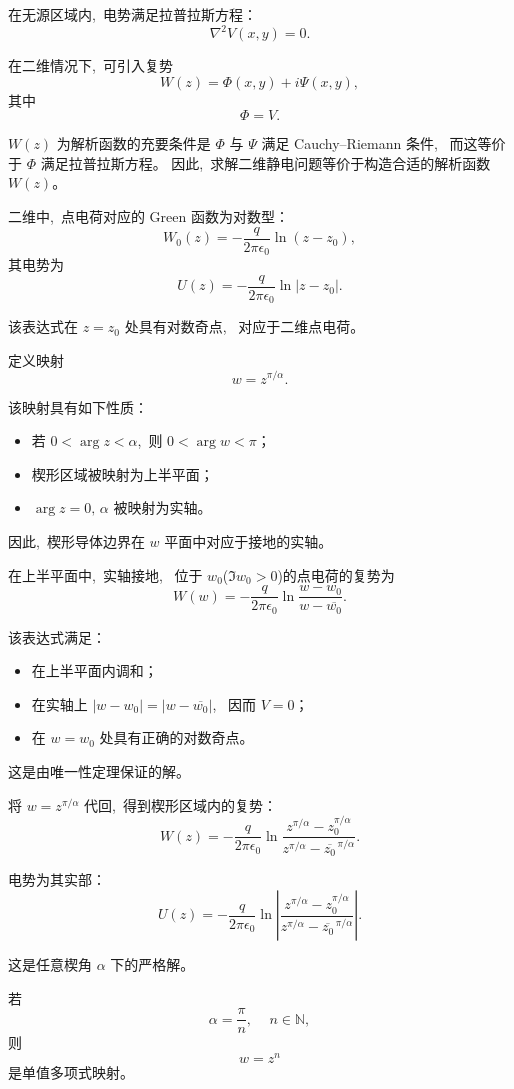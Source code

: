 在无源区域内, \,电势满足拉普拉斯方程：
\[
\nabla^2 V(x,y) = 0.
\]

在二维情况下, \,可引入复势
\[
W(z) = \Phi(x,y) + i \Psi(x,y),
\]
其中
\[
\Phi = V.
\]

$W(z)$ 为解析函数的充要条件是
$\Phi$ 与 $\Psi$ 满足 Cauchy--Riemann 条件, \,
而这等价于 $\Phi$ 满足拉普拉斯方程。
因此, \,求解二维静电问题等价于构造合适的解析函数 $W(z)$。


二维中, \,点电荷对应的 Green 函数为对数型：
\[
W_0(z) =
-\frac{q}{2\pi\epsilon_0} \ln (z - z_0),
\]
其电势为
\[
U(z) = -\frac{q}{2\pi\epsilon_0} \ln |z - z_0|.
\]

该表达式在 $z=z_0$ 处具有对数奇点, \,
对应于二维点电荷。


定义映射
\[
w = z^{\pi/\alpha}.
\]

该映射具有如下性质：
\begin{itemize}
  \item 若 $0 < \arg z < \alpha$, \,则 $0 < \arg w < \pi$；
  \item 楔形区域被映射为上半平面；
  \item $\arg z = 0, \,\alpha$ 被映射为实轴。
\end{itemize}

因此, \,楔形导体边界在 $w$ 平面中对应于接地的实轴。


在上半平面中, \,实轴接地, \,
位于 $w_0$($\Im w_0 > 0$)的点电荷的复势为
\[
W(w)
=
-\frac{q}{2\pi\epsilon_0}
\ln\frac{w - w_0}{w - \overline{w_0}}.
\]

该表达式满足：
\begin{itemize}
  \item 在上半平面内调和；
  \item 在实轴上 $|w-w_0| = |w-\overline{w_0}|$, \,
        因而 $V=0$；
  \item 在 $w=w_0$ 处具有正确的对数奇点。
\end{itemize}

这是由唯一性定理保证的解。



将 $w=z^{\pi/\alpha}$ 代回, \,得到楔形区域内的复势：
\[
W(z)
=
-\frac{q}{2\pi\epsilon_0}
\ln
\frac{
z^{\pi/\alpha} - z_0^{\pi/\alpha}
}{
z^{\pi/\alpha} - \overline{z_0}^{\,\pi/\alpha}
}.
\]

电势为其实部：
\[
U(z)
=
-\frac{q}{2\pi\epsilon_0}
\ln
\left|
\frac{
z^{\pi/\alpha} - z_0^{\pi/\alpha}
}{
z^{\pi/\alpha} - \overline{z_0}^{\,\pi/\alpha}
}
\right|.
\]

这是任意楔角 $\alpha$ 下的严格解。


若
\[
\alpha = \frac{\pi}{n}, \,\quad n \in \mathbb{N},
\]
则
\[
w = z^n
\]
是单值多项式映射。

